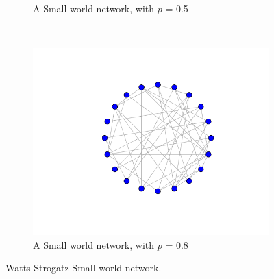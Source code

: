 \begin{figure}[h!]
\begin{subfigure}[b]{0.4\textwidth}
        \caption{A Small world network, with $p$ = 0.5}
        \label{fig }
    \end{subfigure}
    ~ %
    \begin{subfigure}[b]{0.4\textwidth}
        \includegraphics[scale=0.4]{images/sw_p8.png} 
        \caption{A Small world network, with $p$ = 0.8}
        \label{fig }
    \end{subfigure}
    \caption{Watts-Strogatz Small world network.}\label{fig networks}
\end{figure}
